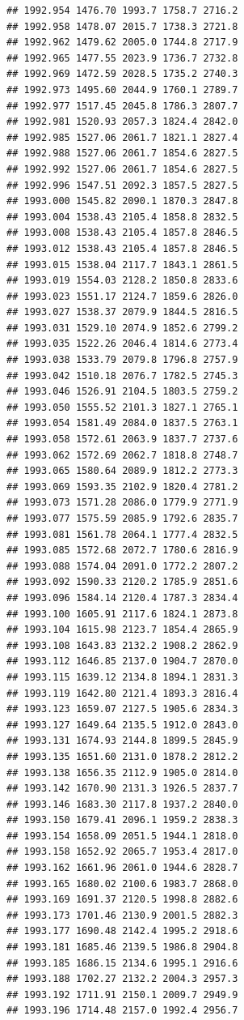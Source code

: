 \documentclass[
]{book}
\begin{document}
\begin{verbatim}
## 1992.954 1476.70 1993.7 1758.7 2716.2
## 1992.958 1478.07 2015.7 1738.3 2721.8
## 1992.962 1479.62 2005.0 1744.8 2717.9
## 1992.965 1477.55 2023.9 1736.7 2732.8
## 1992.969 1472.59 2028.5 1735.2 2740.3
## 1992.973 1495.60 2044.9 1760.1 2789.7
## 1992.977 1517.45 2045.8 1786.3 2807.7
## 1992.981 1520.93 2057.3 1824.4 2842.0
## 1992.985 1527.06 2061.7 1821.1 2827.4
## 1992.988 1527.06 2061.7 1854.6 2827.5
## 1992.992 1527.06 2061.7 1854.6 2827.5
## 1992.996 1547.51 2092.3 1857.5 2827.5
## 1993.000 1545.82 2090.1 1870.3 2847.8
## 1993.004 1538.43 2105.4 1858.8 2832.5
## 1993.008 1538.43 2105.4 1857.8 2846.5
## 1993.012 1538.43 2105.4 1857.8 2846.5
## 1993.015 1538.04 2117.7 1843.1 2861.5
## 1993.019 1554.03 2128.2 1850.8 2833.6
## 1993.023 1551.17 2124.7 1859.6 2826.0
## 1993.027 1538.37 2079.9 1844.5 2816.5
## 1993.031 1529.10 2074.9 1852.6 2799.2
## 1993.035 1522.26 2046.4 1814.6 2773.4
## 1993.038 1533.79 2079.8 1796.8 2757.9
## 1993.042 1510.18 2076.7 1782.5 2745.3
## 1993.046 1526.91 2104.5 1803.5 2759.2
## 1993.050 1555.52 2101.3 1827.1 2765.1
## 1993.054 1581.49 2084.0 1837.5 2763.1
## 1993.058 1572.61 2063.9 1837.7 2737.6
## 1993.062 1572.69 2062.7 1818.8 2748.7
## 1993.065 1580.64 2089.9 1812.2 2773.3
## 1993.069 1593.35 2102.9 1820.4 2781.2
## 1993.073 1571.28 2086.0 1779.9 2771.9
## 1993.077 1575.59 2085.9 1792.6 2835.7
## 1993.081 1561.78 2064.1 1777.4 2832.5
## 1993.085 1572.68 2072.7 1780.6 2816.9
## 1993.088 1574.04 2091.0 1772.2 2807.2
## 1993.092 1590.33 2120.2 1785.9 2851.6
## 1993.096 1584.14 2120.4 1787.3 2834.4
## 1993.100 1605.91 2117.6 1824.1 2873.8
## 1993.104 1615.98 2123.7 1854.4 2865.9
## 1993.108 1643.83 2132.2 1908.2 2862.9
## 1993.112 1646.85 2137.0 1904.7 2870.0
## 1993.115 1639.12 2134.8 1894.1 2831.3
## 1993.119 1642.80 2121.4 1893.3 2816.4
## 1993.123 1659.07 2127.5 1905.6 2834.3
## 1993.127 1649.64 2135.5 1912.0 2843.0
## 1993.131 1674.93 2144.8 1899.5 2845.9
## 1993.135 1651.60 2131.0 1878.2 2812.2
## 1993.138 1656.35 2112.9 1905.0 2814.0
## 1993.142 1670.90 2131.3 1926.5 2837.7
## 1993.146 1683.30 2117.8 1937.2 2840.0
## 1993.150 1679.41 2096.1 1959.2 2838.3
## 1993.154 1658.09 2051.5 1944.1 2818.0
## 1993.158 1652.92 2065.7 1953.4 2817.0
## 1993.162 1661.96 2061.0 1944.6 2828.7
## 1993.165 1680.02 2100.6 1983.7 2868.0
## 1993.169 1691.37 2120.5 1998.8 2882.6
## 1993.173 1701.46 2130.9 2001.5 2882.3
## 1993.177 1690.48 2142.4 1995.2 2918.6
## 1993.181 1685.46 2139.5 1986.8 2904.8
## 1993.185 1686.15 2134.6 1995.1 2916.6
## 1993.188 1702.27 2132.2 2004.3 2957.3
## 1993.192 1711.91 2150.1 2009.7 2949.9
## 1993.196 1714.48 2157.0 1992.4 2956.7

\end{verbatim}
\end{document}
